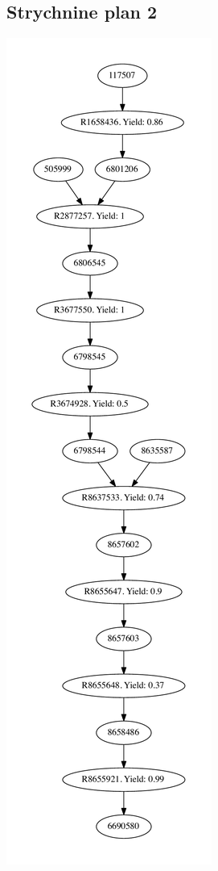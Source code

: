 \documentclass[a4paper,10pt,titlepage]{paper}
\begin{document}
\subsection{Strychnine plan 2}
\centering
\includegraphics[scale=0.4]{Synteseplaner/Strychnine/plan2.pdf}
\label{Appendix::Strychnine2}
\end{document}
